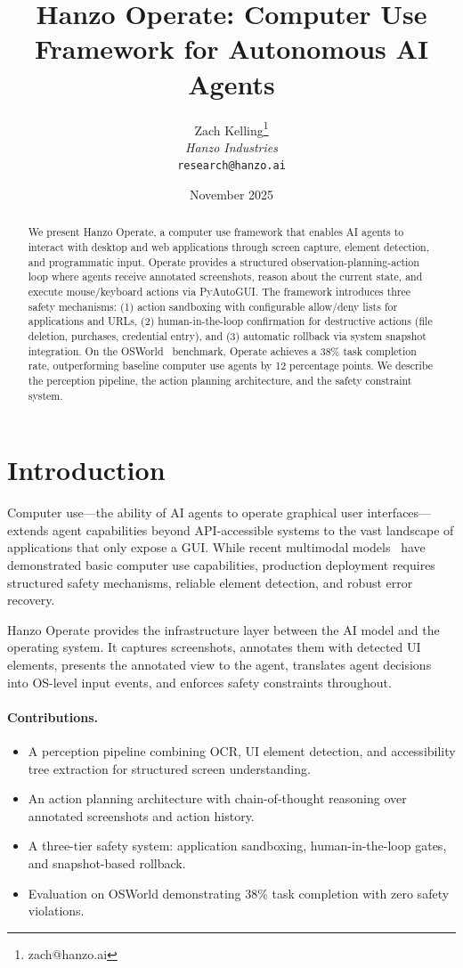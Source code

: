 \documentclass[11pt,twocolumn]{article}
\title{Hanzo Operate: Computer Use Framework for Autonomous AI Agents}
\author{Zach Kelling\thanks{zach@hanzo.ai} \\ \textit{Hanzo Industries} \\ \texttt{research@hanzo.ai}}
\date{November 2025}
\begin{document}
\hanzocoverpage

\begin{abstract}
We present Hanzo Operate, a computer use framework that enables AI agents to interact with desktop and web applications through screen capture, element detection, and programmatic input. Operate provides a structured observation-planning-action loop where agents receive annotated screenshots, reason about the current state, and execute mouse/keyboard actions via PyAutoGUI. The framework introduces three safety mechanisms: (1) action sandboxing with configurable allow/deny lists for applications and URLs, (2) human-in-the-loop confirmation for destructive actions (file deletion, purchases, credential entry), and (3) automatic rollback via system snapshot integration. On the OSWorld~\cite{xie2024} benchmark, Operate achieves a 38\% task completion rate, outperforming baseline computer use agents by 12 percentage points. We describe the perception pipeline, the action planning architecture, and the safety constraint system.
\end{abstract}

\section{Introduction}

Computer use---the ability of AI agents to operate graphical user interfaces---extends agent capabilities beyond API-accessible systems to the vast landscape of applications that only expose a GUI. While recent multimodal models~\cite{anthropic2024} have demonstrated basic computer use capabilities, production deployment requires structured safety mechanisms, reliable element detection, and robust error recovery.

Hanzo Operate provides the infrastructure layer between the AI model and the operating system. It captures screenshots, annotates them with detected UI elements, presents the annotated view to the agent, translates agent decisions into OS-level input events, and enforces safety constraints throughout.

\paragraph{Contributions.}
\begin{itemize}
    \item A perception pipeline combining OCR, UI element detection, and accessibility tree extraction for structured screen understanding.
    \item An action planning architecture with chain-of-thought reasoning over annotated screenshots and action history.
    \item A three-tier safety system: application sandboxing, human-in-the-loop gates, and snapshot-based rollback.
    \item Evaluation on OSWorld demonstrating 38\% task completion with zero safety violations.
\end{itemize}
\end{document}
